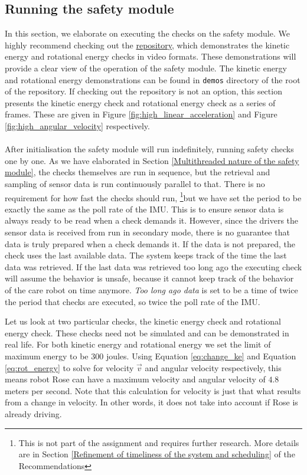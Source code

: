 \documentclass[12pt]{scrreprt}
\begin{document}
\subsection{Running the safety module}
\label{Running the safety module}
In this section, we elaborate on executing the checks on the safety module. We highly recommend checking out the \href{https://github.com/Yousousen/safety-module-for-care-robot-rose}{repository}, which demonstrates the kinetic energy and rotational energy checks in video formats. These demonstrations will provide a clear view of the operation of the safety module. The kinetic energy and rotational energy demonstrations can be found in \texttt{demos} directory of the root of the repository. If checking out the repository is not an option, this section presents the kinetic energy check and rotational energy check as a series of frames. These are given in Figure \ref{fig:high_linear_acceleration} and Figure \ref{fig:high_angular_velocity} respectively.
\\\\
After initialisation the safety module will run indefinitely, running safety checks one by one. As we have elaborated in Section \ref{Multithreaded nature of the safety module}, the checks themselves are run in sequence, but the retrieval and sampling of sensor data is run continuously parallel to that. There is no requirement for how fast the checks should run, \footnote{This is not part of the assignment and requires further research. More details are in Section \ref{Refinement of timeliness of the system and scheduling} of the Recommendations}but we have set the period to be exactly the same as the poll rate of the IMU. This is to ensure sensor data is always ready to be read when a check demands it. However, since the drivers the sensor data is received from run in secondary mode, there is no guarantee that data is truly prepared when a check demands it. If the data is not prepared, the check uses the last available data. The system keeps track of the time the last data was retrieved. If the last data was retrieved too long ago the executing check will assume the behavior is unsafe, because it cannot keep track of the behavior of the care robot on time anymore. \textit{Too long ago data} is set to be a time of twice the period that checks are executed, so twice the poll rate of the IMU.
\par
Let us look at two particular checks, the kinetic energy check and rotational energy check. These checks need not be simulated and can be demonstrated in real life. For both kinetic energy and rotational energy we set the limit of maximum energy to be $300$ joules. Using Equation \ref{eq:change_ke} and Equation \ref{eq:rot_energy} to solve for velocity $\vec{v}$ and angular velocity respectively, this means robot Rose can have a maximum velocity and angular velocity of $4.8$ meters per second. Note that this calculation for velocity is just that what results from a change in velocity. In other words, it does not take into account if Rose is already driving.
\end{document}
